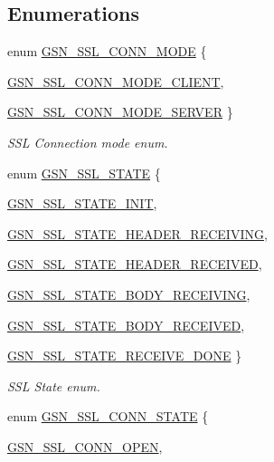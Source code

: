 \subsection*{Enumerations}
\begin{DoxyCompactItemize}
\item 
enum \hyperlink{a00590_a4d55884cc33490a3514a051fccf526c0}{GSN\_\-SSL\_\-CONN\_\-MODE} \{ \par
\hyperlink{a00590_a4d55884cc33490a3514a051fccf526c0a2a8d782da6ea42ea82fc3b4b7d4d6278}{GSN\_\-SSL\_\-CONN\_\-MODE\_\-CLIENT}, 
\par
\hyperlink{a00590_a4d55884cc33490a3514a051fccf526c0a5e4099b5fdead4995a50799880ddad53}{GSN\_\-SSL\_\-CONN\_\-MODE\_\-SERVER}
 \}
\begin{DoxyCompactList}\small\item\em SSL Connection mode enum. \end{DoxyCompactList}\item 
enum \hyperlink{a00590_a2e456f8dfdd4ea1d44ac95d6fc55b36b}{GSN\_\-SSL\_\-STATE} \{ \par
\hyperlink{a00590_a2e456f8dfdd4ea1d44ac95d6fc55b36bab79adb6214fe72959da3b272a79a7baf}{GSN\_\-SSL\_\-STATE\_\-INIT}, 
\par
\hyperlink{a00590_a2e456f8dfdd4ea1d44ac95d6fc55b36ba2f8d693f5b97b1f5f50ed09018feb848}{GSN\_\-SSL\_\-STATE\_\-HEADER\_\-RECEIVING}, 
\par
\hyperlink{a00590_a2e456f8dfdd4ea1d44ac95d6fc55b36ba935a93148b464954ddff860e32666488}{GSN\_\-SSL\_\-STATE\_\-HEADER\_\-RECEIVED}, 
\par
\hyperlink{a00590_a2e456f8dfdd4ea1d44ac95d6fc55b36bad0f09a9e759744e2038fd1c4bcde152f}{GSN\_\-SSL\_\-STATE\_\-BODY\_\-RECEIVING}, 
\par
\hyperlink{a00590_a2e456f8dfdd4ea1d44ac95d6fc55b36ba69d9f0cf691fb086df6aab2b2aa56233}{GSN\_\-SSL\_\-STATE\_\-BODY\_\-RECEIVED}, 
\par
\hyperlink{a00590_a2e456f8dfdd4ea1d44ac95d6fc55b36bac9f319fd7820c93e4bc08c0d19251fe6}{GSN\_\-SSL\_\-STATE\_\-RECEIVE\_\-DONE}
 \}
\begin{DoxyCompactList}\small\item\em SSL State enum. \end{DoxyCompactList}\item 
enum \hyperlink{a00590_ae32da31c01290e41ef6e3d59ee2caf2a}{GSN\_\-SSL\_\-CONN\_\-STATE} \{ \par
\hyperlink{a00590_ae32da31c01290e41ef6e3d59ee2caf2aa14682f9c56550d7bed043cdbe2f267a1}{GSN\_\-SSL\_\-CONN\_\-OPEN}, 

\end{DoxyCompactItemize}
